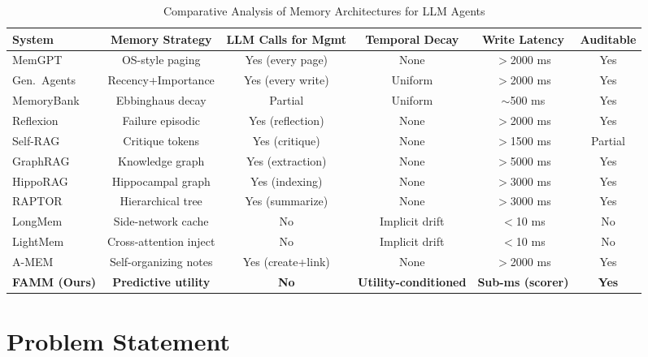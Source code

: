 \documentclass[conference]{IEEEtran}
\begin{document}
\begin{table}[htbp]
\caption{Comparative Analysis of Memory Architectures for LLM Agents}
\label{tab:system_comparison}
\begin{center}
\small
\begin{tabular}{lccccc}
\toprule
\textbf{System} & \textbf{Memory Strategy} & \textbf{LLM Calls for Mgmt} & \textbf{Temporal Decay} & \textbf{Write Latency} & \textbf{Auditable} \\
\midrule
MemGPT \cite{packer2023memgpt} & OS-style paging & Yes (every page) & None & $>$2000 ms & Yes \\
Gen.\ Agents \cite{park2023generative} & Recency+Importance & Yes (every write) & Uniform & $>$2000 ms & Yes \\
MemoryBank \cite{zhong2023memorybank} & Ebbinghaus decay & Partial & Uniform & $\sim$500 ms & Yes \\
Reflexion \cite{shinn2023reflexion} & Failure episodic & Yes (reflection) & None & $>$2000 ms & Yes \\
Self-RAG \cite{asai2023selfrag} & Critique tokens & Yes (critique) & None & $>$1500 ms & Partial \\
GraphRAG \cite{edge2024graphrag} & Knowledge graph & Yes (extraction) & None & $>$5000 ms & Yes \\
HippoRAG \cite{guan2024hipporag} & Hippocampal graph & Yes (indexing) & None & $>$3000 ms & Yes \\
RAPTOR \cite{sarthi2024raptor} & Hierarchical tree & Yes (summarize) & None & $>$3000 ms & Yes \\
LongMem \cite{wang2023longmem} & Side-network cache & No & Implicit drift & $<$10 ms & No \\
LightMem \cite{luo2023lightmem} & Cross-attention inject & No & Implicit drift & $<$10 ms & No \\
A-MEM \cite{zheng2025amem} & Self-organizing notes & Yes (create+link) & None & $>$2000 ms & Yes \\
\midrule
\textbf{FAMM (Ours)} & \textbf{Predictive utility} & \textbf{No} & \textbf{Utility-conditioned} & \textbf{Sub-ms (scorer)} & \textbf{Yes} \\
\bottomrule
\end{tabular}
\end{center}
\end{table}

\section{Problem Statement}
\label{sec:problem}
\end{document}
